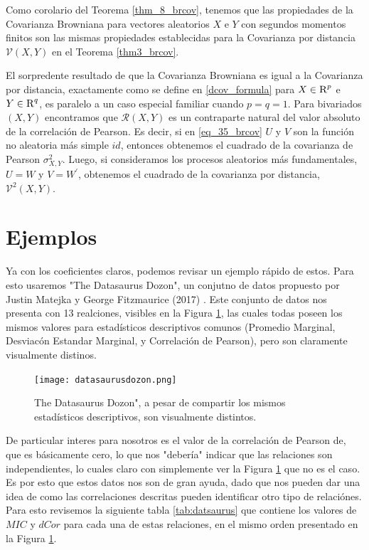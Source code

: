 	Como corolario del Teorema \ref{thm_8_brcov}, tenemos que las propiedades de la Covarianza Browniana para vectores aleatorios $X$ e $Y$ con segundos momentos finitos son las mismas propiedades establecidas para la Covarianza por distancia $\mathcal{V}(X, Y)$ en el Teorema \ref{thm3_brcov}.
	
	El sorpredente resultado de que la Covarianza Browniana es igual a la Covarianza por distancia, exactamente como se define en \ref{dcov_formula} para $X \in \textsc{R}^p$ e $Y \in \textsc{R}^q$, es paralelo a un caso especial familiar cuando $p=q=1$. Para bivariados $(X, Y)$ encontramos que $\mathcal{R}(X, Y)$ es un contraparte natural del valor absoluto de la correlaci\'on de Pearson. Es decir, si en \ref{eq_35_brcov} $U$ y $V$ son la funci\'on no aleatoria m\'as simple $id$, entonces obtenemos el cuadrado de la covarianza de Pearson $\sigma_{X, Y}^2$. Luego, si consideramos los procesos aleatorios m\'as fundamentales, $U=W$ y $V=W^{\prime}$, obtenemos el cuadrado de la covarianza por distancia, $\mathcal{V}^2(X, Y)$.


    \section{Ejemplos}

    Ya con los coeficientes claros, podemos revisar un ejemplo r\'apido de estos. Para esto usaremos "The Datasaurus Dozon", un conjutno de datos propuesto por Justin Matejka y George Fitzmaurice (2017) \cite{datasaurus}. Este conjunto de datos nos presenta con 13 realciones, visibles en la Figura \ref{datasaurus_fig}, las cuales todas poseen los mismos valores para estad\'isticos descriptivos comunos (Promedio Marginal, Desviac\'on Estandar Marginal, y Correlaci\'on de Pearson), pero son claramente visualmente distinos.

    \begin{figure} 
        \centering
        \texttt{[image: datasaurusdozon.png]}
        \caption{The Datasaurus Dozon", a pesar de compartir los mismos estad\'isticos descriptivos, son visualmente distintos.}
        \label{datasaurus_fig}
    \end{figure}

    De particular interes para nosotros es el valor de la correlaci\'on de Pearson de, que es b\'asicamente cero, lo que nos "deber\'ia" indicar que las relaciones son independientes, lo cuales claro con simplemente ver la Figura \ref{datasaurus_fig} que no es el caso. Es por esto que estos datos nos son de gran ayuda, dado que nos pueden dar una idea de como las correlaciones descritas pueden identificar otro tipo de relaci\'ones. Para esto revisemos la siguiente tabla \ref{tab:datsaurus} que contiene los valores de $MIC$ y $dCor$ para cada una de estas relaciones, en el mismo orden presentado en la Figura \ref{datasaurus_fig}.

